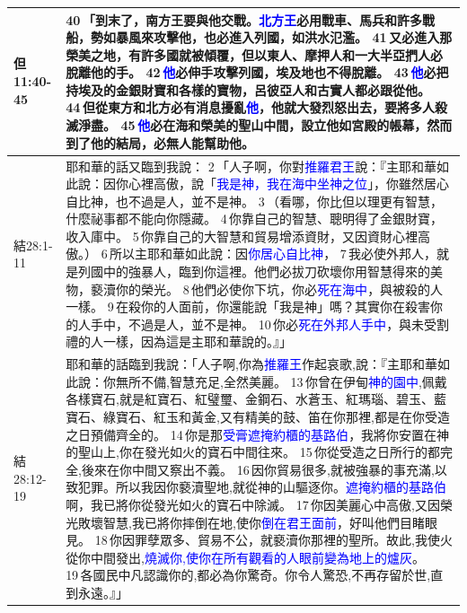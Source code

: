 \begin{table}[H]
\begin{tabular}{p{1.25cm}|p{16.25cm}}
  但11:40-45&40 「到末了，南方王要與他交戰。\textcolor{blue}{北方王}必用戰車、馬兵和許多戰船，勢如暴風來攻擊他，也必進入列國，如洪水氾濫。 41 又必進入那榮美之地，有許多國就被傾覆，但以東人、摩押人和一大半亞捫人必脫離他的手。 42 \textcolor{blue}{他}必伸手攻擊列國，埃及地也不得脫離。 43 \textcolor{blue}{他}必把持埃及的金銀財寶和各樣的寶物，呂彼亞人和古實人都必跟從他。 44 但從東方和北方必有消息擾亂\textcolor{blue}{他}，他就大發烈怒出去，要將多人殺滅淨盡。 45 \textcolor{blue}{他}必在海和榮美的聖山中間，設立他如宮殿的帳幕，然而到了他的結局，必無人能幫助他。\\\hline
    
結28:1-11&耶和華的話又臨到我說： 2 「人子啊，你對\textcolor{blue}{推羅君王}說：『主耶和華如此說：因你心裡高傲，說「\textcolor{blue}{我是神，我在海中坐神之位}」，你雖然居心自比神，也不過是人，並不是神。 3 （看哪，你比但以理更有智慧，什麼祕事都不能向你隱藏。 4 你靠自己的智慧、聰明得了金銀財寶，收入庫中。 5 你靠自己的大智慧和貿易增添資財，又因資財心裡高傲。） 6 所以主耶和華如此說：因\textcolor{blue}{你居心自比神}， 7 我必使外邦人，就是列國中的強暴人，臨到你這裡。他們必拔刀砍壞你用智慧得來的美物，褻瀆你的榮光。 8 他們必使你下坑，你必\textcolor{blue}{死在海中}，與被殺的人一樣。 9 在殺你的人面前，你還能說「我是神」嗎？其實你在殺害你的人手中，不過是人，並不是神。 10 你必\textcolor{blue}{死在外邦人手中}，與未受割禮的人一樣，因為這是主耶和華說的。』」\\\hline

結28:12-19&耶和華的話臨到我說：「人子啊,你為\textcolor{blue}{推羅王}作起哀歌,說：『主耶和華如此說：你無所不備,智慧充足,全然美麗。 13 你曾在伊甸\textcolor{blue}{神的園中},佩戴各樣寶石,就是紅寶石、紅璧璽、金鋼石、水蒼玉、紅瑪瑙、碧玉、藍寶石、綠寶石、紅玉和黃金,又有精美的鼓、笛在你那裡,都是在你受造之日預備齊全的。 14 你是那\textcolor{blue}{受膏遮掩約櫃的基路伯}，我將你安置在神的聖山上,你在發光如火的寶石中間往來。 15 你從受造之日所行的都完全,後來在你中間又察出不義。 16 因你貿易很多,就被強暴的事充滿,以致犯罪。所以我因你褻瀆聖地,就從神的山驅逐你。\textcolor{blue}{遮掩約櫃的基路伯}啊，我已將你從發光如火的寶石中除滅。 17 你因美麗心中高傲,又因榮光敗壞智慧,我已將你摔倒在地,使你\textcolor{blue}{倒在君王面前}，好叫他們目睹眼見。 18 你因罪孽眾多、貿易不公，就褻瀆你那裡的聖所。故此,我使火從你中間發出,\textcolor{blue}{燒滅你,使你在所有觀看的人眼前變為地上的爐灰}。 19 各國民中凡認識你的,都必為你驚奇。你令人驚恐,不再存留於世,直到永遠。』」\\\hline
\end{tabular}
\end{table}



